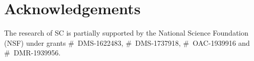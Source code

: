 \documentclass[ejs]{imsart}
\theoremstyle{definition} \newtheorem{Definition}[Theorem]{Definition}
\begin{document}








\section*{Acknowledgements}
The research of SC is partially  supported by the National Science Foundation (NSF) 
under grants 
\#~DMS-1622483, \#~DMS-1737918, \#~OAC-1939916 and \#~DMR-1939956.





\end{document}

